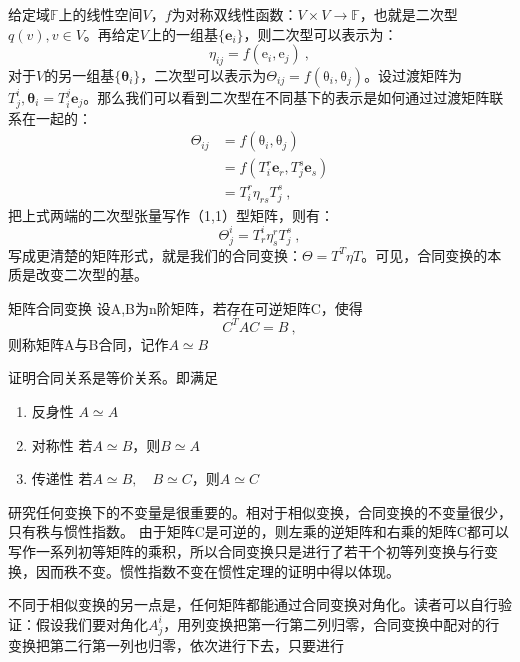 

\begin{issues}
\issueDraft
\end{issues}

给定域$\mathbb F$上的线性空间$V$，$f$为对称双线性函数：$V\times V\to \mathbb F$，也就是二次型$q(v),v\in V$。再给定$V$上的一组基$\{\boldsymbol e_i\}$，则二次型可以表示为：
\begin{equation}
\eta_{ij}=f(\boldsymbol {\mathrm e}_i,\boldsymbol {\mathrm e}_j)~,
\end{equation}
对于$V$的另一组基$\{\boldsymbol \theta_i\}$，二次型可以表示为$\Theta_{ij}=f(\boldsymbol {\mathrm \theta}_{i},\boldsymbol {\mathrm \theta}_{j})$。设过渡矩阵为$T^i_j,\boldsymbol {\theta}_i=T^j_i\boldsymbol e_j$。那么我们可以看到二次型在不同基下的表示是如何通过过渡矩阵联系在一起的：
\begin{equation}
\begin{aligned}
\Theta_{ij}&=f(\boldsymbol {\mathrm \theta}_{i},\boldsymbol {\mathrm \theta}_{j})\\
&=f(T^r_i\boldsymbol e_r,T^s_j\boldsymbol e_s)\\
&=T^r_i \eta_{rs}T^s_j~,
\end{aligned}
\end{equation}
把上式两端的二次型张量写作（1,1）型矩阵，则有：
$$\Theta^i_j=T^i_r\eta^r_sT^s_j~,$$
写成更清楚的矩阵形式，就是我们的合同变换：$\Theta=T^T\eta T$。可见，合同变换的本质是改变二次型的基。
\begin{definition}{矩阵合同变换}
设A,B为n阶矩阵，若存在可逆矩阵C，使得
\begin{equation}
C^TAC=B~,
\end{equation}
则称矩阵A与B合同，记作$A\simeq B$
\end{definition}
\begin{exercise}{}
证明合同关系是等价关系。即满足
\begin{enumerate}
\item 反身性  $A\simeq A$
\item 对称性  若$A\simeq B$，则$B\simeq A$
\item 传递性  若$A\simeq B,\quad B\simeq C$，则$A\simeq C$
\end{enumerate}
\end{exercise}
研究任何变换下的不变量是很重要的。相对于相似变换，合同变换的不变量很少，只有秩与惯性指数。
由于矩阵C是可逆的，则左乘的逆矩阵和右乘的矩阵C都可以写作一系列初等矩阵的乘积，所以合同变换只是进行了若干个初等列变换与行变换，因而秩不变。惯性指数不变在惯性定理的证明中得以体现。

不同于相似变换的另一点是，任何矩阵都能通过合同变换对角化。读者可以自行验证：假设我们要对角化$A^i_j$，用列变换把第一行第二列归零，合同变换中配对的行变换把第二行第一列也归零，依次进行下去，只要进行